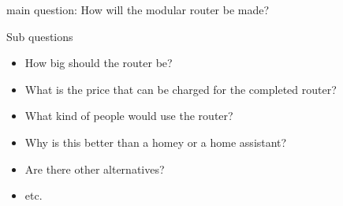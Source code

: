 
main question: How will the modular router be made?

Sub questions

\begin{itemize}
    \item How big should the router be?
    \item What is the price that can be charged for the completed router?
    \item What kind of people would use the router?
    \item Why is this better than a homey or a home assistant?
    \item Are there other alternatives?
    \item etc. 
\end{itemize}